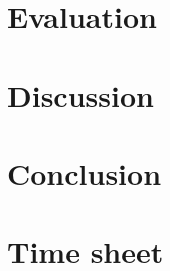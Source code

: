 \documentclass{acm_proc_article-sp}
\begin{document}
\section{Evaluation}
\label{sec_eval}

\section{Discussion}
\label{sec_discussion}

\section{Conclusion}
\label{sec_conclusion}

{}


\appendix
\section{Time sheet}
\end{document}
